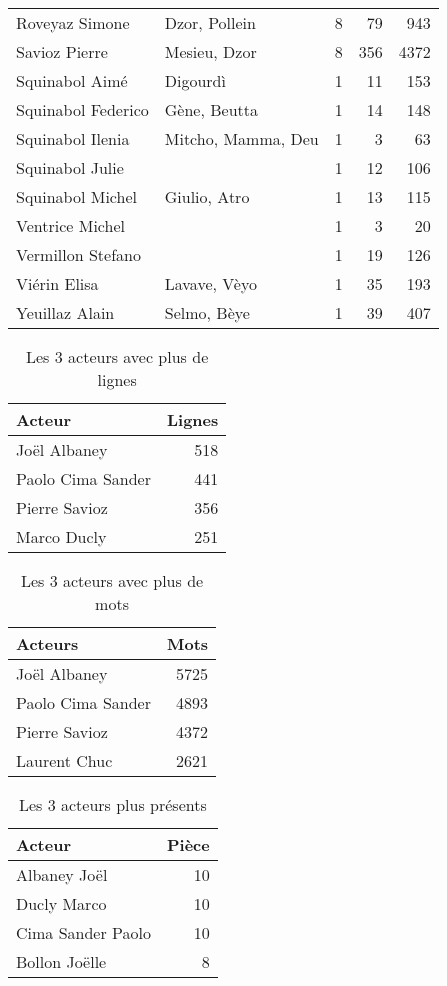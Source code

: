 \begin{longtable}{llrrr}
Roveyaz Simone &Dzor, Pollein & 8 & 79 & 943\\
Savioz Pierre &Mesieu, Dzor & 8 & 356 & 4372\\
Squinabol Aimé &Digourdì & 1 & 11 & 153\\
Squinabol Federico &Gène, Beutta & 1 & 14 & 148\\
Squinabol Ilenia &Mitcho, Mamma, Deu & 1 & 3 & 63\\
Squinabol Julie & & 1 & 12 & 106\\
Squinabol Michel &Giulio, Atro & 1 & 13 & 115\\
Ventrice Michel & & 1 & 3 & 20\\
Vermillon Stefano & & 1 & 19 & 126\\
Viérin Elisa &Lavave, Vèyo & 1 & 35 & 193\\
Yeuillaz Alain &Selmo, Bèye & 1 & 39 & 407\\
\bottomrule
\end{longtable}
\begin{table}[]
\centering
\caption{Les 3 acteurs avec plus de lignes}
\begin{tabular}{l|r}
\toprule
\multicolumn{1}{l}{\textbf{Acteur}} & \textbf{Lignes} \\
\midrule

\multicolumn{1}{l}{Joël Albaney} &518\\
\multicolumn{1}{l}{Paolo Cima Sander} &441\\
\multicolumn{1}{l}{Pierre Savioz} &356\\
\multicolumn{1}{l}{Marco Ducly} &251\\
\bottomrule
\end{tabular}%
\end{table}
\begin{table}[]
\centering
\caption{Les 3 acteurs avec plus de mots}
\begin{tabular}{l|r}
    \toprule
\multicolumn{1}{l}{\textbf{Acteurs}} & \textbf{Mots} \\
    \midrule
\multicolumn{1}{l}{Joël Albaney} &5725\\
\multicolumn{1}{l}{Paolo Cima Sander} &4893\\
\multicolumn{1}{l}{Pierre Savioz} &4372\\
\multicolumn{1}{l}{Laurent Chuc} &2621\\
\bottomrule
\end{tabular}%
\end{table}
\begin{table}[]
\centering
\caption{Les 3 acteurs plus présents}
\begin{tabular}{lr}
    \toprule
\multicolumn{1}{l}{\textbf{Acteur}} & \textbf{Pièce} \\
    \midrule
\multicolumn{1}{l}{Albaney Joël} &10\\
\multicolumn{1}{l}{Ducly Marco} &10\\
\multicolumn{1}{l}{Cima Sander Paolo} &10\\
\multicolumn{1}{l}{Bollon Joëlle} &8\\
\bottomrule
\end{tabular}%
\end{table}
